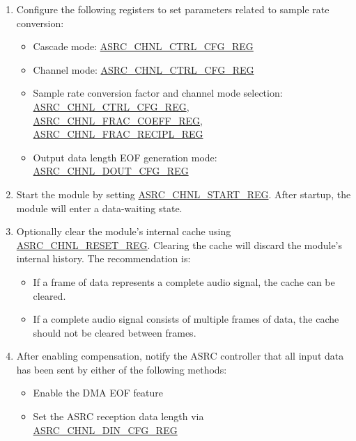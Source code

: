\documentclass[main\_\_EN.tex]{subfiles}
\begin{document}
\begin{enumerate}
  \item Configure the following registers to set parameters related to sample rate conversion:

  \begin{itemize}
    \item Cascade mode: \hyperref[regdesc:ASRCCHNL0CTRLCFGREG]{ASRC\_CHNL\_CTRL\_CFG\_REG}
    \item Channel mode: \hyperref[regdesc:ASRCCHNL0CTRLCFGREG]{ASRC\_CHNL\_CTRL\_CFG\_REG}
    \item Sample rate conversion factor and channel mode selection: \hyperref[regdesc:ASRCCHNL0CTRLCFGREG]{ASRC\_CHNL\_CTRL\_CFG\_REG}, \hyperref[regdesc:ASRCCHNL0FRACCOEFFREG]{ASRC\_CHNL\_FRAC\_COEFF\_REG}, \hyperref[regdesc:ASRCCHNL0FRACRECIPLREG]{ASRC\_CHNL\_FRAC\_RECIPL\_REG}
    \item Output data length EOF generation mode: \hyperref[regdesc:ASRCCHNL0DOUTCFGREG]{ASRC\_CHNL\_DOUT\_CFG\_REG}
  \end{itemize}

  \item Start the module by setting \hyperref[regdesc:ASRCCHNL0STARTREG]{ASRC\_CHNL\_START\_REG}. After startup, the module will enter a data-waiting state.

  \item Optionally clear the module’s internal cache using \hyperref[regdesc:ASRCCHNL0RESETREG]{ASRC\_CHNL\_RESET\_REG}. Clearing the cache will discard the module's internal history. The recommendation is:

  \begin{itemize}
    \item If a frame of data represents a complete audio signal, the cache can be cleared.
    \item If a complete audio signal consists of multiple frames of data, the cache should not be cleared between frames.
  \end{itemize}

  \item After enabling compensation, notify the ASRC controller that all input data has been sent by either of the following methods:

  \begin{itemize}
    \item Enable the DMA EOF feature
    \item Set the ASRC reception data length via \hyperref[regdesc:ASRCCHNL0DINCFGREG]{ASRC\_CHNL\_DIN\_CFG\_REG}
  \end{itemize}


\end{enumerate}
\end{document}
